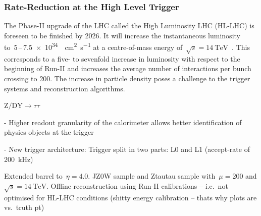 \subsubsection{Rate-Reduction at the High Level Trigger}
\label{sec:hlt_rate_reduction}

The Phase-II upgrade of the LHC called the High Luminosity LHC (HL-LHC) is
foreseen to be finished by 2026. It will increase the instantaneous luminosity
to~\num{5}\,--\,\SI{7.5e34}{\per\square\centi\metre\per\second} at a
centre-of-mass energy
of~$\sqrt{s} = \SI{14}{\TeV}$~\cite{hl_lhc_prelim_design_report}. This
corresponds to a five- to sevenfold increase in luminosity with respect to the
beginning of Run-II and increases the average number of interactions per bunch
crossing to \num{200}. The increase in particle density poses a challenge to the
trigger systems and reconstruction algorithms.




$\text{Z} / \text{DY} \to \tau \tau$


- Higher readout granularity of the calorimeter allows better identification of physics objects at the trigger

- New trigger architecture: Trigger split in two parts: L0 and L1 (accept-rate of \SI{200}{\kilo\hertz})

Extended barrel to~$\eta = \num{4.0}$. JZ0W sample  and
Ztautau sample with~$\mu = \num{200}$ and $\sqrt{s} = \SI{14}{\TeV}$. Offline
reconstruction using Run-II calibrations -- i.e.\ not optimised for HL-LHC
conditions (shitty energy calibration -- thats why plots are vs.\ truth pt)

